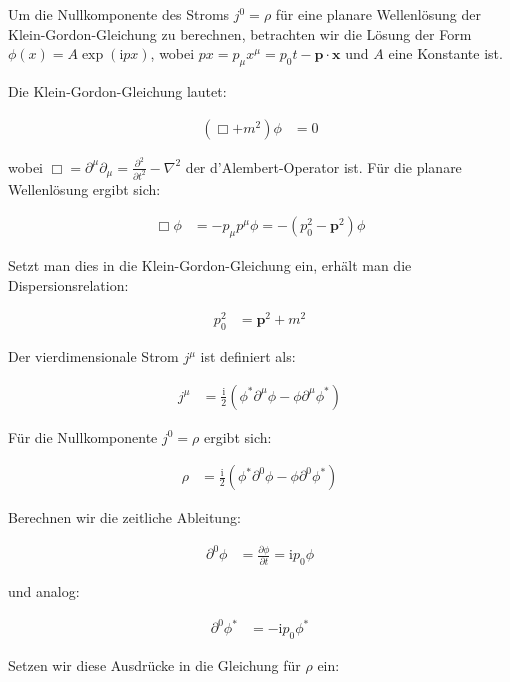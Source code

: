Um die Nullkomponente des Stroms $j^0 = \rho$ für eine planare Wellenlösung der Klein-Gordon-Gleichung zu berechnen, betrachten wir die Lösung der Form $\phi(x) = A \exp(\mathrm{i} p x)$, wobei $p x = p_\mu x^\mu = p_0 t - \mathbf{p} \cdot \mathbf{x}$ und $A$ eine Konstante ist.

Die Klein-Gordon-Gleichung lautet:

\begin{align*}
(\Box + m^2) \phi &= 0
\end{align*}

wobei $\Box = \partial^\mu \partial_\mu = \frac{\partial^2}{\partial t^2} - \nabla^2$ der d'Alembert-Operator ist. Für die planare Wellenlösung ergibt sich:

\begin{align*}
\Box \phi &= -p_\mu p^\mu \phi = -(p_0^2 - \mathbf{p}^2) \phi
\end{align*}

Setzt man dies in die Klein-Gordon-Gleichung ein, erhält man die Dispersionsrelation:

\begin{align*}
p_0^2 &= \mathbf{p}^2 + m^2
\end{align*}

Der vierdimensionale Strom $j^\mu$ ist definiert als:

\begin{align*}
j^\mu &= \frac{\mathrm{i}}{2} \left( \phi^* \partial^\mu \phi - \phi \partial^\mu \phi^* \right)
\end{align*}

Für die Nullkomponente $j^0 = \rho$ ergibt sich:

\begin{align*}
\rho &= \frac{\mathrm{i}}{2} \left( \phi^* \partial^0 \phi - \phi \partial^0 \phi^* \right)
\end{align*}

Berechnen wir die zeitliche Ableitung:

\begin{align*}
\partial^0 \phi &= \frac{\partial \phi}{\partial t} = \mathrm{i} p_0 \phi
\end{align*}

und analog:

\begin{align*}
\partial^0 \phi^* &= -\mathrm{i} p_0 \phi^*
\end{align*}

Setzen wir diese Ausdrücke in die Gleichung für $\rho$ ein:

